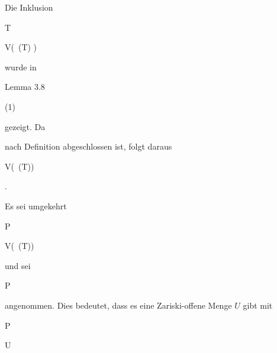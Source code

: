 {


Die Inklusion


\mavergleichskette


{\vergleichskette


{ T
}


{ \subseteq }{ V(  \,(T) )
}


{  }{
}


{    }{
}


{   }{
}


}
{}{}{}
wurde in

Lemma 3.8

 (1)

gezeigt. Da


 nach Definition abgeschlossen ist, folgt daraus


\mavergleichskette


{\vergleichskette


{ 
}


{ \subseteq }{ V(  \,(T))
}


{  }{
}


{    }{
}


{   }{
}


}
{}{}{.}


Es sei umgekehrt


\mavergleichskette


{\vergleichskette


{ P
}


{ \in }{ V(  \,(T))
}


{  }{
}


{    }{
}


{   }{
}


}
{}{}{}
und sei


\mavergleichskette


{\vergleichskette


{ P
}


{ \notin }{ 
}


{  }{
}


{    }{
}


{   }{
}


}
{}{}{}
angenommen. Dies bedeutet, dass es eine Zariski-offene Menge $U$ gibt mit


\mavergleichskette


{\vergleichskette


{ P
}


{ \in }{ U
}


{  }{
}


}}
